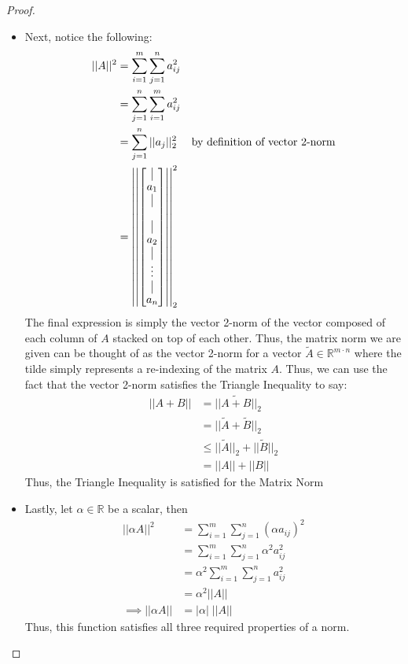 \documentclass[10pt,a4paper]{article}
\theoremstyle{definition}
\theoremstyle{definition}
\numberwithin{equation}{section}
\begin{document}
\begin{enumerate}[label = (\alph*)]
\begin{proof}
\begin{itemize}
	\item Next, notice the following:
	\begin{align*}
	||A||^2 &= \sum_{i = 1}^m \sum_{j = 1}^n a_{ij}^2\\
	&= \sum_{j = 1}^n \sum_{i = 1}^m a_{ij}^2 \\
	&= \sum_{j = 1}^n ||a_j||_2^2 &\text{by definition of vector 2-norm}\\
	&= \left|\left|\begin{bmatrix}
	\vline\\
	a_1\\
	\vline\\
	\\
	\vline\\
	a_2\\
	\vline\\
	\vdots\\
	\vline\\
	a_{n}
	\end{bmatrix}
	\right|\right|_2^2\\
	\end{align*}
	The final expression is simply the vector 2-norm of the vector composed of each column of $A$ stacked on top of each other. Thus, the matrix norm we are given can be thought of as the vector 2-norm for a vector $\widetilde{A} \in \mathbb{R}^{m\cdot n}$ where the tilde simply represents a re-indexing of the matrix $A$. Thus, we can use the fact that the vector 2-norm satisfies the Triangle Inequality to say:
	\begin{align*}
	||A + B|| &= ||\widetilde{A + B}||_2\\
	&= ||\widetilde{A} + \widetilde{B}||_2\\
	&\leq ||\widetilde{A}||_2 + ||\widetilde{B}||_2\\
	&= ||A|| + ||B||
	\end{align*}
	Thus, the Triangle Inequality is satisfied for the Matrix Norm
	\item Lastly, let $\alpha \in \mathbb{R}$ be a scalar, then
	\begin{align*}
	||\alpha A||^2 &= \sum_{i = 1}^m \sum_{j = 1}^n (\alpha a_{ij})^2\\
	&= \sum_{i = 1}^m \sum_{j = 1}^n \alpha^2 a_{ij}^2\\
	&= \alpha^2 \sum_{i = 1}^m \sum_{j = 1}^n a_{ij}^2\\
	&= \alpha^2 ||A||\\
	\implies ||\alpha A|| &= |\alpha| \; ||A||
	\end{align*}
	Thus, this function satisfies all three required properties of a norm. 
	\end{itemize}
\end{proof}
\end{enumerate}
\end{document}
